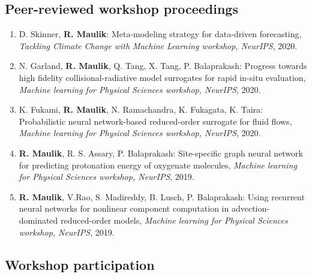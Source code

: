 \documentclass[letterpaper]{article}
\begin{document}
\subsection*{Peer-reviewed workshop proceedings}

\begin{enumerate}

\item D. Skinner, \textbf{R. Maulik}: Meta-modeling strategy for data-driven forecasting, \textit{Tackling Climate Change with Machine Learning workshop, NeurIPS}, 2020.

\item N. Garland, \textbf{R. Maulik}, Q. Tang, X. Tang, P. Balaprakash: Progress towards high fidelity collisional-radiative model surrogates for rapid in-situ evaluation, \textit{Machine learning for Physical Sciences workshop, NeurIPS}, 2020.

\item K. Fukami, \textbf{R. Maulik}, N. Ramachandra, K. Fukagata, K. Taira: Probabilistic neural network-based reduced-order surrogate for fluid flows, \textit{Machine learning for Physical Sciences workshop, NeurIPS}, 2020.

\item \textbf{R. Maulik}, R. S. Assary, P. Balaprakash: Site-specific graph neural network for predicting protonation energy of oxygenate molecules, {\it Machine learning for Physical Sciences workshop, NeurIPS}, 2019.

\item \textbf{R. Maulik}, V.Rao, S. Madireddy, B. Lusch, P. Balaprakash: Using recurrent neural networks for nonlinear component computation in advection-dominated reduced-order models, \textit{Machine learning for Physical Sciences workshop, NeurIPS}, 2019.


\end{enumerate}

\subsection*{Workshop participation}
\end{document}
